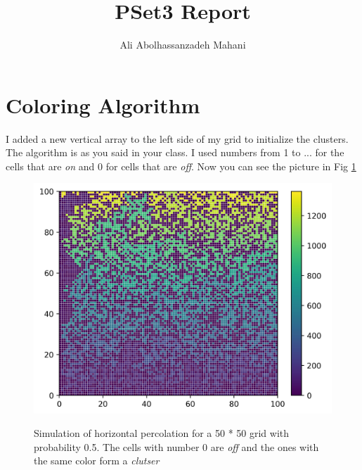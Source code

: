 \documentclass[12pt]{article}
\title{PSet3 Report}
\author{Ali Abolhassanzadeh Mahani}
\begin{document}
	\maketitle
	
	\section{Coloring Algorithm}
	I added a new vertical array to the left side of my grid to initialize the clusters. The algorithm is as you said
	in your class. I used numbers from 1 to ... for the cells that are \emph{on} and 0 for cells that are \emph{off}.
	Now you can see the picture in Fig \ref{fig:Color}
	\begin{figure}[h!]
		\centering
		\includegraphics[width=0.9\linewidth]{../p2/colored.jpg}
		\label{fig:Color}
		\caption{Simulation of horizontal percolation for a 50 * 50 grid with probability 0.5. The cells with number 0 are \emph{off} and the ones with the same color form a \emph{clutser}}
	\end{figure}
\end{document}
